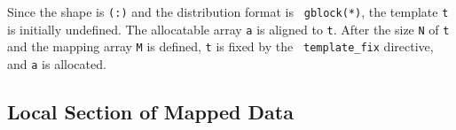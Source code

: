 Since the shape is {\tt (:)} and the distribution format is {\tt
gblock(*)}, 
the template {\tt t} is initially undefined. The allocatable array
{\tt a} is aligned to {\tt t}. After the size {\tt N} of {\tt t} and the
mapping array {\tt M} is defined, {\tt t} is fixed by the {\tt
  template\_fix} directive, and {\tt a} is allocated.


\subsection{Local Section of Mapped Data}